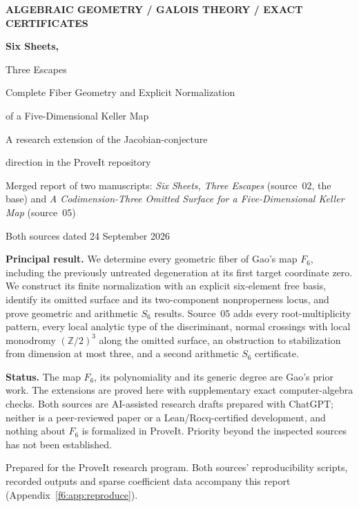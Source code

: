 \documentclass[11pt,a4paper]{article}
\theoremstyle{definition}
\newcommand{\Z}{\mathbb Z}
\begin{document}
\hypersetup{pageanchor=false}
\begin{titlepage}
\color{Ink}
\vspace*{12mm}
{\small\sffamily\bfseries\color{Accent} ALGEBRAIC GEOMETRY \; / \; GALOIS THEORY \; / \; EXACT CERTIFICATES\par}
\vspace{17mm}
{\Huge\bfseries Six Sheets,\par Three Escapes\par}
\vspace{8mm}
{\LARGE Complete Fiber Geometry and Explicit Normalization\par}
\vspace{3mm}
{\Large of a Five-Dimensional Keller Map\par}
\vspace{14mm}
{\large A research extension of the Jacobian-conjecture\par direction in the ProveIt repository\par}
\vspace{5mm}
{\normalsize Merged report of two manuscripts: \emph{Six Sheets, Three Escapes}
(source~02, the base) and \emph{A Codimension-Three Omitted Surface for a
Five-Dimensional Keller Map} (source~05)\par}
\vspace{5mm}
{Both sources dated 24 September 2026\par}
\vfill
\begin{claimbox}
\textbf{Principal result.} We determine every geometric fiber of Gao's map
$F_6$, including the previously untreated degeneration at its first target
coordinate zero. We construct its finite normalization with an explicit
six-element free basis, identify its omitted surface and its two-component
nonproperness locus, and prove geometric and arithmetic $S_6$ results.
Source~05 adds every root-multiplicity pattern, every local analytic type of
the discriminant, normal crossings with local monodromy $(\Z/2)^3$ along the
omitted surface, an obstruction to stabilization from dimension at most
three, and a second arithmetic $S_6$ certificate.

\textbf{Status.} The map $F_6$, its polynomiality and its generic degree are
Gao's prior work. The extensions are proved here with supplementary exact
computer-algebra checks. Both sources are AI-assisted research drafts
prepared with ChatGPT; neither is a peer-reviewed paper or a
Lean/Rocq-certified development, and nothing about $F_6$ is formalized in
ProveIt. Priority beyond the inspected sources has not been established.
\end{claimbox}
\vspace{6mm}
{\small Prepared for the ProveIt research program. Both sources' reproducibility
scripts, recorded outputs and sparse coefficient data accompany this report
(Appendix~\ref{f6:app:reproduce}).\par}
\end{titlepage}
\hypersetup{pageanchor=true}
\end{document}
